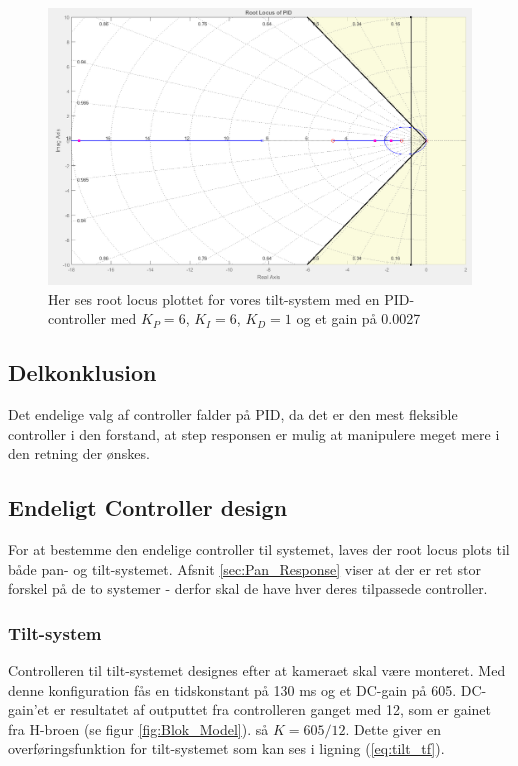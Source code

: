 \begin{figure}[!ht]
	\begin{center}
		\includegraphics[scale=0.45]{Billeder/PID_rlocus.PNG}
	\end{center}
\caption{Her ses root locus plottet for vores tilt-system med en PID-controller med $K_{P}=6$, $K_{I}=6$, $K_{D}=1$ og et gain på 0.0027}
\label{fig:PID_rlocus}
\end{figure}

\subsection{Delkonklusion}

Det endelige valg af controller falder på PID, da det er den mest fleksible controller i den forstand, at step responsen er mulig at manipulere meget mere i den retning der ønskes.

\subsection{Endeligt Controller design}

For at bestemme den endelige controller til systemet, laves der root locus plots til både pan- og tilt-systemet. Afsnit \ref{sec:Pan_Response} viser at der er ret stor forskel på de to systemer - derfor skal de have hver deres tilpassede controller.

\subsubsection{Tilt-system}

Controlleren til tilt-systemet designes efter at kameraet skal være monteret. Med denne konfiguration fås en tidskonstant på 130 ms og et DC-gain på 605. DC-gain'et er resultatet af outputtet fra controlleren ganget med 12, som er gainet fra H-broen (se figur \ref{fig:Blok_Model}). så $K=605/12$. Dette giver en overføringsfunktion for tilt-systemet som kan ses i ligning (\ref{eq:tilt_tf}). 


